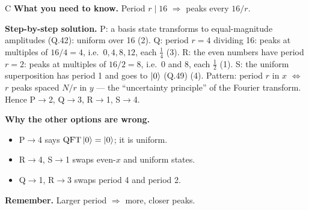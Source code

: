 \documentclass[11pt,a4paper]{article}
\newcommand{\qsep}{\par\vspace{2pt}{\color{black!15}\hrule}\vspace{4pt}}
\newcommand{\QFTop}{\mathrm{QFT}}
\begin{document}
\begin{solbox}{C}
\textbf{\color{brand}What you need to know.} Period $r \mid 16$ $\Rightarrow$ peaks every $16/r$.

\textbf{\color{brand}Step-by-step solution.} P: a basis state transforms to equal-magnitude amplitudes (Q.42): uniform over 16 (2).
Q: period $r = 4$ dividing 16: peaks at multiples of $16/4 = 4$, i.e.\ $0, 4, 8, 12$, each $\frac14$ (3).
R: the even numbers have period $r = 2$: peaks at multiples of $16/2 = 8$, i.e.\ $0$ and $8$, each $\frac12$ (1).
S: the uniform superposition has period 1 and goes to $\ket0$ (Q.49) (4).
Pattern: period $r$ in $x$ $\Leftrightarrow$ $r$ peaks spaced $N/r$ in $y$ --- the ``uncertainty principle'' of the Fourier
transform. Hence P$\to$2, Q$\to$3, R$\to$1, S$\to$4.

\textbf{\color{brand}Why the other options are wrong.}
\begin{itemize}[leftmargin=2.4em, itemsep=1pt, topsep=2pt]
\item[\textbf{(A)}] P$\to$4 says $\QFTop\ket0 = \ket0$; it is uniform.
\item[\textbf{(B)}] R$\to$4, S$\to$1 swaps even-$x$ and uniform states.
\item[\textbf{(D)}] Q$\to$1, R$\to$3 swaps period 4 and period 2.
\end{itemize}
\textbf{\color{brand}Remember.} Larger period $\Rightarrow$ more, closer peaks.
\end{solbox}
\qsep
\end{document}
